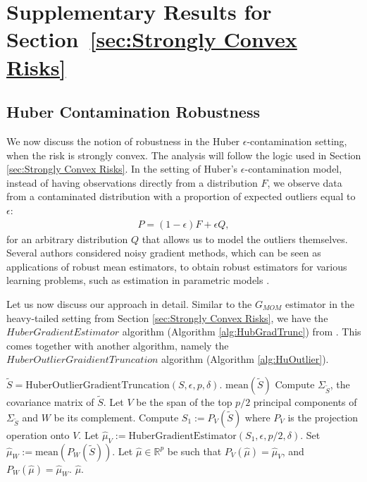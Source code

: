 \documentclass{article}
\begin{document}

\section{Supplementary Results for Section~\ref{sec:Strongly Convex Risks}}
\label{sec:Huber epsilon-Contamination Robustness}

\subsection{Huber Contamination Robustness} 

We now discuss the notion of robustness in the Huber $\epsilon$-contamination setting, when the risk is strongly convex. The analysis will follow the logic used in Section \ref{sec:Strongly Convex Risks}. In the setting of Huber’s $\epsilon$-contamination model, instead of having observations directly from a distribution $F$, we observe data from a contaminated distribution with a proportion of expected outliers equal to $\epsilon$:
\begin{align*}
P = (1-\epsilon)F + \epsilon Q,
\end{align*}
for an arbitrary distribution $Q$ that allows us to model the outliers themselves. Several authors \cite{RE, CompIntr, Balakrish} considered noisy gradient methods, which can be seen as applications of robust mean estimators, to obtain robust estimators for various learning problems, such as estimation in parametric models \cite{DP_ROB_HIGH_DIM, NO_ROB_LR}.

Let us now discuss our approach in detail. Similar to the $G_{MOM}$ estimator in the heavy-tailed setting from Section \ref{sec:Strongly Convex Risks}, we have the $HuberGradientEstimator$ algorithm (Algorithm \ref{alg:HubGradTrunc}) from \cite{RE}. This comes together with another algorithm, namely the $HuberOutlierGraidientTruncation$ algorithm (Algorithm \ref{alg:HuOutlier}).
\begin{algorithm}
\caption{Huber Gradient Estimator}\label{alg:HubGradTrunc}
\begin{algorithmic}[1]
    \State $\widetilde{S} = \text{HuberOutlierGradientTruncation}(S, \epsilon, p, \delta)$.
        \State \Return $\text{mean}(\widetilde{S})$
    \Else
        \State Compute $\Sigma_{\widetilde{S}}$, the covariance matrix of $\widetilde{S}$.
        \State Let $V$ be the span of the top $p/2$ principal components of $\Sigma_{\widetilde{S}}$ and $W$ be its complement.
        \State Compute $S_1 := P_V(\widetilde{S})$ where $P_V$ is the projection operation onto $V$.
        \State Let $\widehat{\mu}_{V} := \text{HuberGradientEstimator}(S_1, \epsilon, p/2, \delta)$.
        \State Set $\widehat{\mu}_{W} := \text{mean}(P_W(\widetilde{S}))$.
        \State Let $\widehat{\mu} \in \mathbb{R}^p$ be such that $P_V(\widehat{\mu}) = \widehat{\mu}_V$, and $P_W(\widehat{\mu}) = \widehat{\mu}_W$.
        \State \Return $\widehat{\mu}$.
    \EndIf
\EndFunction
\end{algorithmic}
\end{algorithm}
\end{document}
